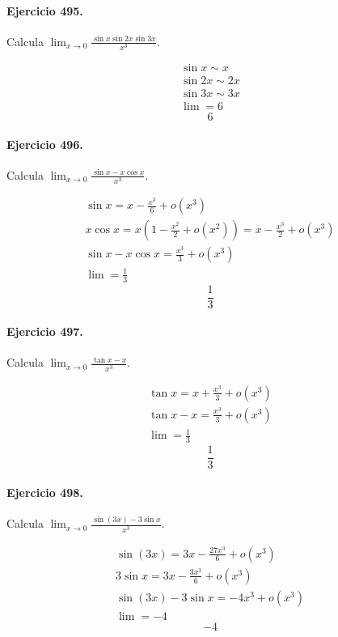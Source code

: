 \documentclass[11pt,a4paper]{article}
\begin{document}
\paragraph{Ejercicio 495.} Calcula $\displaystyle \lim_{x\to0}\frac{\sin x\sin2x\sin3x}{x^3}$.

\[
\begin{aligned}
\sin x\sim x\\
\sin2x\sim2x\\
\sin3x\sim3x\\
\lim=6
\end{aligned}
\]
\[\boxed{6}\]


\paragraph{Ejercicio 496.} Calcula $\displaystyle \lim_{x\to0}\frac{\sin x-x\cos x}{x^3}$.

\[
\begin{aligned}
\sin x=x-\frac{x^3}{6}+o(x^3)\\
x\cos x=x\left(1-\frac{x^2}{2}+o(x^2)\right)=x-\frac{x^3}{2}+o(x^3)\\
\sin x-x\cos x=\frac{x^3}{3}+o(x^3)\\
\lim=\frac13
\end{aligned}
\]
\[\boxed{\frac13}\]


\paragraph{Ejercicio 497.} Calcula $\displaystyle \lim_{x\to0}\frac{\tan x-x}{x^3}$.

\[
\begin{aligned}
\tan x=x+\frac{x^3}{3}+o(x^3)\\
\tan x-x=\frac{x^3}{3}+o(x^3)\\
\lim=\frac13
\end{aligned}
\]
\[\boxed{\frac13}\]


\paragraph{Ejercicio 498.} Calcula $\displaystyle \lim_{x\to0}\frac{\sin(3x)-3\sin x}{x^3}$.

\[
\begin{aligned}
\sin(3x)=3x-\frac{27x^3}{6}+o(x^3)\\
3\sin x=3x-\frac{3x^3}{6}+o(x^3)\\
\sin(3x)-3\sin x=-4x^3+o(x^3)\\
\lim=-4
\end{aligned}
\]
\[\boxed{-4}\]
\end{document}
